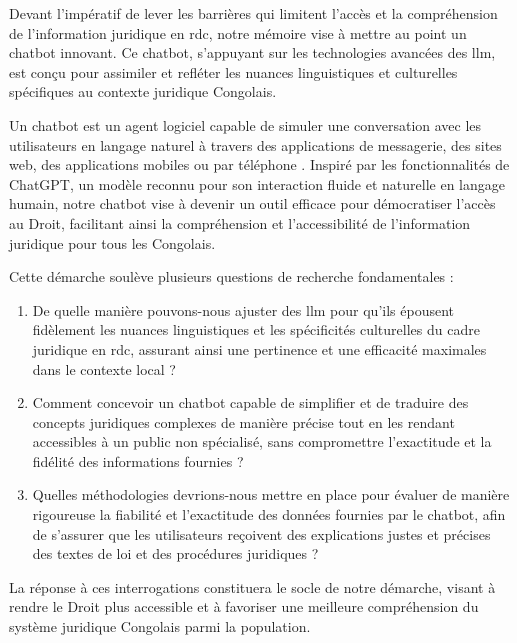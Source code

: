 Devant l'impératif de lever les barrières qui limitent l'accès et la compréhension de l'information juridique en \ac{rdc}, notre mémoire vise à mettre au point un chatbot innovant. Ce chatbot, s'appuyant sur les technologies avancées des \ac{llm}, est conçu pour assimiler et refléter les nuances linguistiques et culturelles spécifiques au contexte juridique Congolais. 

Un chatbot est un agent logiciel capable de simuler une conversation avec les utilisateurs en langage naturel à travers des applications de messagerie, des sites web, des applications mobiles ou par téléphone \cite{Pritchett_2019}. Inspiré par les fonctionnalités de ChatGPT, un modèle reconnu pour son interaction fluide et naturelle en langage humain, notre chatbot vise à devenir un outil efficace pour démocratiser l'accès au Droit, facilitant ainsi la compréhension et l'accessibilité de l'information juridique pour tous les Congolais.

Cette démarche soulève plusieurs questions de recherche fondamentales :

\begin{enumerate}
    \item De quelle manière pouvons-nous ajuster des \ac{llm} pour qu'ils épousent fidèlement les nuances linguistiques et les spécificités culturelles du cadre juridique en \ac{rdc}, assurant ainsi une pertinence et une efficacité maximales dans le contexte local ?
    
    \item Comment concevoir un chatbot capable de simplifier et de traduire des concepts juridiques complexes de manière précise tout en les rendant accessibles à un public non spécialisé, sans compromettre l'exactitude et la fidélité des informations fournies ?

    \item Quelles méthodologies devrions-nous mettre en place pour évaluer de manière rigoureuse la fiabilité et l'exactitude des données fournies par le chatbot, afin de s'assurer que les utilisateurs reçoivent des explications justes et précises des textes de loi et des procédures juridiques ?
\end{enumerate}

La réponse à ces interrogations constituera le socle de notre démarche, visant à rendre le Droit plus accessible et à favoriser une meilleure compréhension du système juridique Congolais parmi la population.

